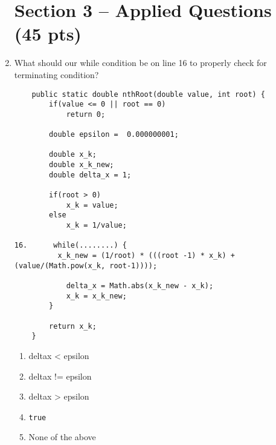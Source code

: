 \documentclass[S17-Final.tex]{subfiles}
\begin{document}
\begin{enumerate}



	
\clearpage
\section*{Section 3 -- Applied Questions (45 pts)}
\item What should our while condition be on line 16 to properly check for terminating condition?
\begin{lstlisting}
    public static double nthRoot(double value, int root) {
  		if(value <= 0 || root == 0)
    		return 0;

		double epsilon =  0.000000001;
		
		double x_k;
		double x_k_new;
		double delta_x = 1;
		
		if(root > 0)
		    x_k = value;
		else
		    x_k = 1/value;

16.      while(........) {
          x_k_new = (1/root) * (((root -1) * x_k) + (value/(Math.pow(x_k, root-1))));
   		    
            delta_x = Math.abs(x_k_new - x_k);
            x_k = x_k_new;
        }
	
        return x_k;
    }
\end{lstlisting}
	
\begin{enumerate}
\item  delta\textunderscore x \textless{} epsilon
\item  delta\textunderscore x {!=} epsilon
\item  delta\textunderscore x \textgreater{} epsilon \ifdraft \Ans \fi 
\item  \texttt{true}
\item  None of the above
\end{enumerate}


\end{enumerate}
\end{document}
